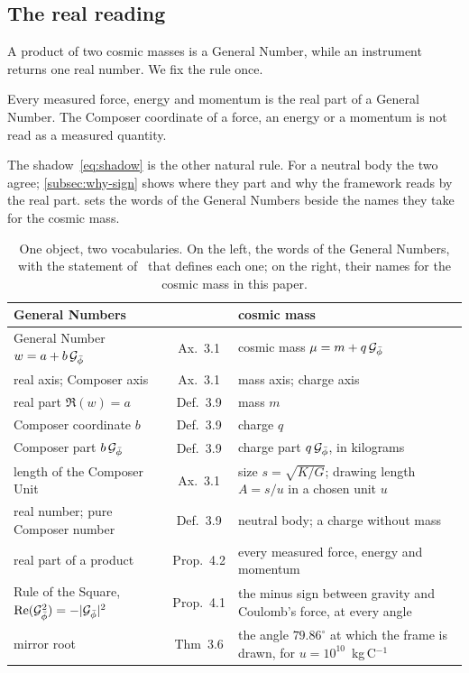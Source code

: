 \subsection{The real reading}\label{subsec:real-reading}

A product of two cosmic masses is a General Number, while an instrument returns one real number. We fix the rule once.

\begin{postulate}\label{def:real-reading}
Every measured force, energy and momentum is the real part of a General Number. The Composer coordinate of a force, an energy or a momentum is not read as a measured quantity.
\end{postulate}

The shadow~\cref{eq:shadow} is the other natural rule. For a neutral body the two agree; \cref{subsec:why-sign} shows where they part and why the framework reads by the real part.  sets the words of the General Numbers beside the names they take for the cosmic mass.

\begin{table}[t]
\caption{One object, two vocabularies. On the left, the words of the General Numbers, with the statement of~\citep{DerrazGN2026} that defines each one; on the right, their names for the cosmic mass in this paper.}
\label{tab:dictionary}
\small
\begin{tabularx}{\textwidth}{@{}>{\raggedright\arraybackslash}p{}c>{\raggedright\arraybackslash}X@{}}
\toprule
General Numbers & \citep{DerrazGN2026} & cosmic mass \\
\midrule
General Number $w = a + b\,\mathcal{G}_{\bar{\phi}}$ & Ax.~3.1 & cosmic mass $\mu = m + q\,\mathcal{G}_{\bar{\phi}}$ \\
real axis; Composer axis & Ax.~3.1 & mass axis; charge axis \\
real part $\Re(w) = a$ & Def.~3.9 & mass $m$ \\
Composer coordinate $b$ & Def.~3.9 & charge $q$ \\
Composer part $b\,\mathcal{G}_{\bar{\phi}}$ & Def.~3.9 & charge part $q\,\mathcal{G}_{\bar{\phi}}$, in kilograms \\
length of the Composer Unit & Ax.~3.1 & size $s = \sqrt{K/G}$; drawing length $A = s/u$ in a chosen unit $u$ \\
real number; pure Composer number & Def.~3.9 & neutral body; a charge without mass \\
real part of a product & Prop.~4.2 & every measured force, energy and momentum \\
Rule of the Square, $\operatorname{Re}(\mathcal{G}_{\bar{\phi}}^2) = -\lvert\mathcal{G}_{\bar{\phi}}\rvert^2$ & Prop.~4.1 & the minus sign between gravity and Coulomb's force, at every angle \\
mirror root & Thm~3.6 & the angle $79.86^\circ$ at which the frame is drawn, for $u = 10^{10}$~kg\,C$^{-1}$ \\
\bottomrule
\end{tabularx}
\end{table}
